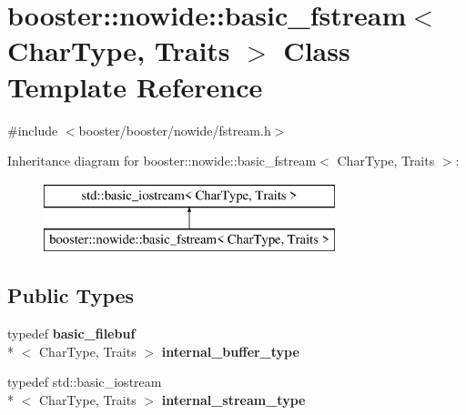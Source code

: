 \section{booster\-:\-:nowide\-:\-:basic\-\_\-fstream$<$ Char\-Type, Traits $>$ Class Template Reference}
\label{classbooster_1_1nowide_1_1basic__fstream}


{\ttfamily \#include $<$booster/booster/nowide/fstream.\-h$>$}

Inheritance diagram for booster\-:\-:nowide\-:\-:basic\-\_\-fstream$<$ Char\-Type, Traits $>$\-:\begin{figure}[H]
\begin{center}
\leavevmode
\includegraphics[height=2.000000cm]{classbooster_1_1nowide_1_1basic__fstream}
\end{center}
\end{figure}
\subsection*{Public Types}
\begin{DoxyCompactItemize}
\item 
typedef {\bf basic\-\_\-filebuf}\\*
$<$ Char\-Type, Traits $>$ {\bfseries internal\-\_\-buffer\-\_\-type}\label{classbooster_1_1nowide_1_1basic__fstream_a34fd09bc911e53133f4d38e251d6c6e7}

\item 
typedef std\-::basic\-\_\-iostream\\*
$<$ Char\-Type, Traits $>$ {\bfseries internal\-\_\-stream\-\_\-type}\label{classbooster_1_1nowide_1_1basic__fstream_a7644af06e695c66947a515214ae17820}

\end{DoxyCompactItemize}
